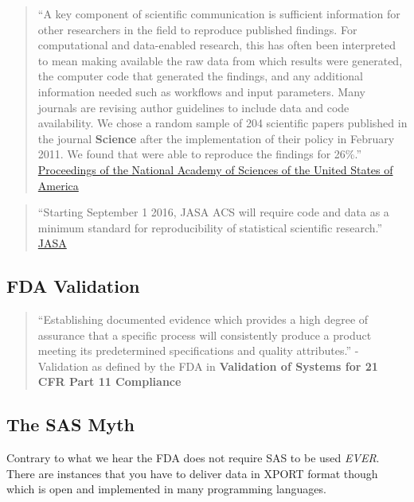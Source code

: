\documentclass[]{book}
\theoremstyle{definition}
\theoremstyle{definition}
\theoremstyle{definition}
\theoremstyle{remark}
\begin{document}
\begin{quote}
``A key component of scientific communication is sufficient information
for other researchers in the field to reproduce published findings. For
computational and data-enabled research, this has often been interpreted
to mean making available the raw data from which results were generated,
the computer code that generated the findings, and any additional
information needed such as workflows and input parameters. Many journals
are revising author guidelines to include data and code availability. We
chose a random sample of 204 scientific papers published in the journal
\textbf{Science} after the implementation of their policy in February
2011. We found that were able to reproduce the findings for 26\%.''
\href{http://www.pnas.org/content/115/11/2584}{Proceedings of the
National Academy of Sciences of the United States of America}
\end{quote}

\begin{quote}
``Starting September 1 2016, JASA ACS will require code and data as a
minimum standard for reproducibility of statistical scientific
research.''
\href{https://magazine.amstat.org/blog/2016/07/01/jasa-reproducible16/}{JASA}
\end{quote}

\hypertarget{fda-validation}{%
\subsection{FDA Validation}\label{fda-validation}}

\begin{quote}
``Establishing documented evidence which provides a high degree of
assurance that a specific process will consistently produce a product
meeting its predetermined specifications and quality attributes.''
-Validation as defined by the FDA in \textbf{Validation of Systems for
21 CFR Part 11 Compliance}
\end{quote}

\hypertarget{the-sas-myth}{%
\subsection{The SAS Myth}\label{the-sas-myth}}

Contrary to what we hear the FDA does not require SAS to be used
\emph{EVER}. There are instances that you have to deliver data in XPORT
format though which is open and implemented in many programming
languages.
\end{document}
